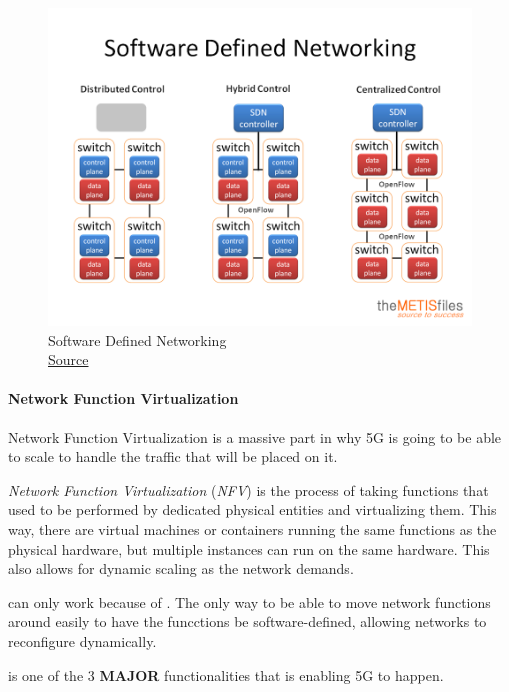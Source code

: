 \begin{figure}[h!tbp]
  \centering
  \includegraphics[scale=0.5]{./Drawings/ETSN10-Network_Architecture_Performance/software-defined-networking.png}
  \caption{Software Defined Networking \\ \href{https://www.themetisfiles.com/2012/10/the-future-of-the-network-is-software-defined/}{Source}}
  \label{fig:SDN}
\end{figure}

\paragraph{Network Function Virtualization}\label{par:NFV}
Network Function Virtualization is a massive part in why 5G is going to be able to scale to handle the traffic that will be placed on it.

\begin{definition}\label{def:Network_Function_Virtualization}
  \emph{Network Function Virtualization} (\emph{NFV}) is the process of taking functions that used to be performed by dedicated physical entities and virtualizing them.
  This way, there are virtual machines or containers running the same functions as the physical hardware, but multiple instances can run on the same hardware.
  This also allows for dynamic scaling as the network demands.

  \begin{remark}\label{rmk:NFV_Rely_SDN}
     can only work because of .
    The only way to be able to move network functions around easily to have the funcctions be software-defined, allowing networks to reconfigure dynamically.
  \end{remark}

  \begin{remark}\label{rmk:NFV_Core_5G}
     is one of the 3 \textbf{MAJOR} functionalities that is enabling 5G to happen.
  \end{remark}
\end{definition}


